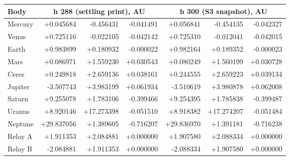 \par\noindent
\begin{tabular}{lrrrrrr}
\toprule
Body & \multicolumn{3}{c}{h 288 (settling print), AU} & \multicolumn{3}{c}{h 300 (S3 snapshot), AU}\\
\midrule
Mercury & +0.045684 & -0.456431 & -0.041491 & +0.056841 & -0.454135 & -0.042327\\
Venus & +0.725116 & -0.022105 & -0.042142 & +0.725310 & -0.012041 & -0.042015\\
Earth & +0.983899 & +0.180932 & -0.000022 & +0.982164 & +0.189352 & -0.000023\\
Mars & +0.086971 & +1.559230 & +0.030543 & +0.080249 & +1.560199 & +0.030728\\
Ceres & +0.249818 & +2.659136 & +0.038161 & +0.244555 & +2.659223 & +0.039134\\
Jupiter & -3.507743 & +3.983199 & +0.061934 & -3.510619 & +3.980878 & +0.062008\\
Saturn & +9.255078 & +1.783106 & -0.399466 & +9.254395 & +1.785838 & -0.399487\\
Uranus & +8.920146 & +17.273398 & -0.051510 & +8.918382 & +17.274207 & -0.051484\\
Neptune & +29.837056 & +1.389605 & -0.716207 & +29.836970 & +1.391181 & -0.716238\\
Relay A & +1.911353 & +2.084881 & +0.000000 & +1.907580 & +2.088334 & +0.000000\\
Relay B & -2.084881 & +1.911353 & +0.000000 & -2.088334 & +1.907580 & +0.000000\\
\bottomrule
\end{tabular}\par
